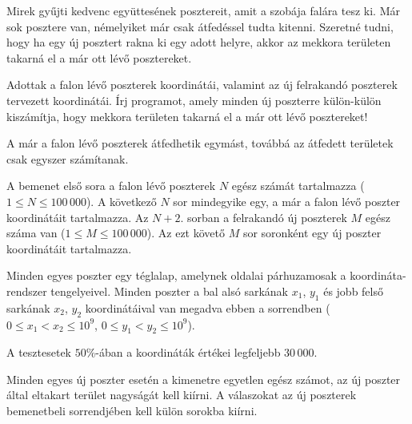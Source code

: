 

\usepackage{tikz}





Mirek gyűjti kedvenc együttesének posztereit, amit a szobája falára tesz ki. Már sok posztere van, némelyiket már csak átfedéssel tudta kitenni. Szeretné tudni, hogy ha egy új posztert rakna ki egy adott helyre, akkor az mekkora területen takarná el a már ott lévő posztereket. 

Adottak a falon lévő poszterek koordinátái, valamint az új felrakandó poszterek tervezett koordinátái. Írj programot, amely minden új poszterre külön-külön kiszámítja, hogy mekkora területen takarná el a már ott lévő posztereket!

A már a falon lévő poszterek átfedhetik egymást, továbbá az átfedett területek csak egyszer számítanak. 

A bemenet első sora a falon lévő poszterek $N$ egész számát tartalmazza ($1 \le N \le 100\,000$). A következő $N$ sor mindegyike egy, a már a falon lévő poszter koordinátáit tartalmazza. Az $N+2$. sorban a felrakandó új poszterek $M$ egész száma van ($1 \le M \le 100\,000$). Az ezt követő $M$ sor soronként egy új poszter koordinátáit tartalmazza.

Minden egyes poszter egy téglalap, amelynek oldalai párhuzamosak a koordináta-rendszer tengelyeivel. Minden poszter a bal alsó sarkának $x_1$, $y_1$ és jobb felső sarkának $x_2$, $y_2$ koordinátáival van megadva ebben a sorrendben ($0 \le x_1 < x_2 \le 10^9$, $0 \le y_1 < y_2 \le 10^9$).

A tesztesetek $50\%$-ában a koordináták értékei legfeljebb $30\,000$.

Minden egyes új poszter esetén a kimenetre egyetlen egész számot, az új poszter által eltakart terület nagyságát kell kiírni. A válaszokat az új poszterek bemenetbeli sorrendjében kell külön sorokba kiírni. 



